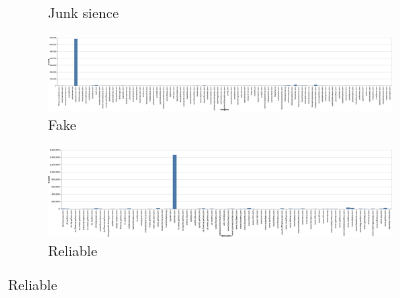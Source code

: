 \begin{figure}[!ht]
\begin{subfigure}[b]{0.3\textwidth}
         \caption{Junk sience}
     \end{subfigure}
     \vfill
     \begin{subfigure}[b]{1\textwidth}
         \centering
         \includegraphics[width=\textwidth]{images/data_exploration/fake.eps}
         \caption{Fake}
     \end{subfigure}
     \vfill
     \begin{subfigure}[b]{1\textwidth}
         \centering
         \includegraphics[width=\textwidth]{images/data_exploration/reliable.eps}
         \caption{Reliable}
     \end{subfigure}
\end{figure}
